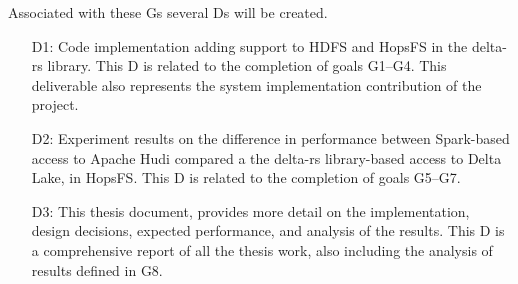Associated with these \glspl{G} several \glspl{D} will be created. 
\begin{enumerate}
    \item[D1:] Code implementation adding support to \gls{HDFS} and \gls{HopsFS} in the delta-rs library. This \gls{D} is related to the completion of goals G1--G4. This deliverable also represents the system implementation contribution of the project.
    \item[D2:] Experiment results on the difference in performance between Spark-based access to Apache Hudi compared a the delta-rs library-based access to Delta Lake, in \gls{HopsFS}.
    This \gls{D} is related to the completion of goals G5--G7.
    \item[D3:] This thesis document, provides more detail on the implementation, design decisions, expected performance, and analysis of the results.
    This \gls{D} is a comprehensive report of all the thesis work, also including the analysis of results defined in G8.
\end{enumerate}
